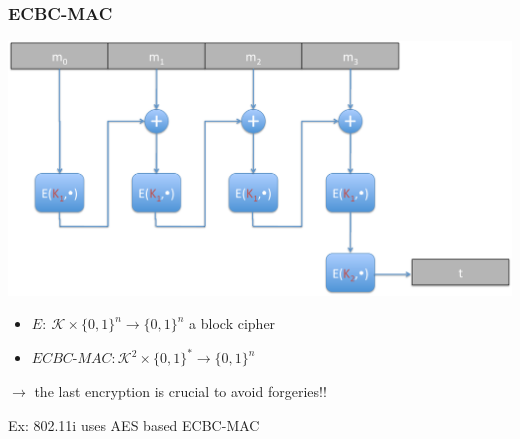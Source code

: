 \documentclass[aspectratio=169, lualatex, handout, 10pt,dvipsnames,svgnames]{beamer} %
\def\envert#1{\textcolor{vert}{#1}}
\def\enrouge#1{\textcolor{rouge}{#1}}
\newcommand{\Kcal}{\mathcal{K}}
\begin{document}
\begin{frame}

  \frametitle{ECBC-MAC}
\vspace{-0.5cm}
  
  \begin{center}
    \includegraphics[scale=0.3]{Images/ECBC-MAC.pdf}
  \end{center}

  \begin{itemize}
  \item $E:\ \Kcal\times \{0, 1\}^n\rightarrow \{0, 1\}^n$ a block cipher
  \item $ECBC\text{-}MAC: \Kcal^2\times \{0, 1\}^*\rightarrow \{0, 1\}^n$
  \end{itemize}
  \enrouge{$\rightarrow$ the last encryption is crucial to avoid forgeries!!}

  \envert{Ex: 802.11i uses AES based ECBC-MAC}
\end{frame}
\end{document}
